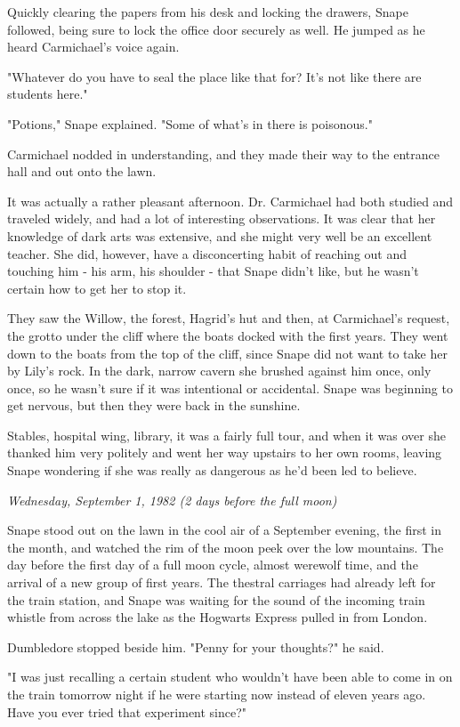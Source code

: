 \documentclass[a4paper,11pt]{article}
\begin{document}
Quickly clearing the papers from his desk and locking the drawers, Snape followed, being sure to lock the office door securely as well. He jumped as he heard Carmichael's voice again.

"Whatever do you have to seal the place like that for? It's not like there are students here."

"Potions," Snape explained. "Some of what's in there is poisonous."

Carmichael nodded in understanding, and they made their way to the entrance hall and out onto the lawn.

It was actually a rather pleasant afternoon. Dr. Carmichael had both studied and traveled widely, and had a lot of interesting observations. It was clear that her knowledge of dark arts was extensive, and she might very well be an excellent teacher. She did, however, have a disconcerting habit of reaching out and touching him - his arm, his shoulder - that Snape didn't like, but he wasn't certain how to get her to stop it.

They saw the Willow, the forest, Hagrid's hut and then, at Carmichael's request, the grotto under the cliff where the boats docked with the first years. They went down to the boats from the top of the cliff, since Snape did not want to take her by Lily's rock. In the dark, narrow cavern she brushed against him once, only once, so he wasn't sure if it was intentional or accidental. Snape was beginning to get nervous, but then they were back in the sunshine.

Stables, hospital wing, library, it was a fairly full tour, and when it was over she thanked him very politely and went her way upstairs to her own rooms, leaving Snape wondering if she was really as dangerous as he'd been led to believe.

\emph{Wednesday, September 1, 1982 (2 days before the full moon)}

Snape stood out on the lawn in the cool air of a September evening, the first in the month, and watched the rim of the moon peek over the low mountains. The day before the first day of a full moon cycle, almost werewolf time, and the arrival of a new group of first years. The thestral carriages had already left for the train station, and Snape was waiting for the sound of the incoming train whistle from across the lake as the Hogwarts Express pulled in from London.

Dumbledore stopped beside him. "Penny for your thoughts?" he said.

"I was just recalling a certain student who wouldn't have been able to come in on the train tomorrow night if he were starting now instead of eleven years ago. Have you ever tried that experiment since?"
\end{document}
